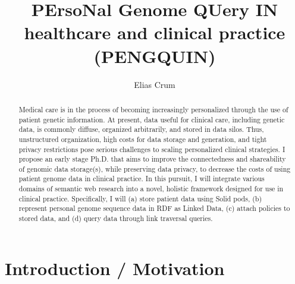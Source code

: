 \documentclass[runningheads]{llncs}
\begin{document}
\title{PErsoNal Genome QUery IN healthcare and clinical practice (PENGQUIN)}

\author{Elias Crum}



\maketitle

\begin{abstract}
    Medical care is in the process of becoming increasingly personalized through the use of patient genetic information. 
    At present, data useful for clinical care, including genetic data, is commonly diffuse, organized arbitrarily, and stored in data silos. 
    Thus, unstructured organization, high costs for data storage and generation, and tight privacy restrictions pose serious challenges to scaling personalized clinical strategies.
    I propose an early stage Ph.D. that aims to improve the connectedness and shareability of genomic data storage(s), while preserving data privacy, to decrease the costs of using patient genome data in clinical practice. 
    In this pursuit, I will integrate various domains of semantic web research into a novel, holistic framework designed for use in clinical practice.
    Specifically, I will (a) store patient data using Solid pods, (b) represent personal genome sequence data in RDF as Linked Data, (c) attach policies to stored data, and (d) query data through link traversal queries.


\end{abstract}


\section{Introduction / Motivation}

\end{document}
